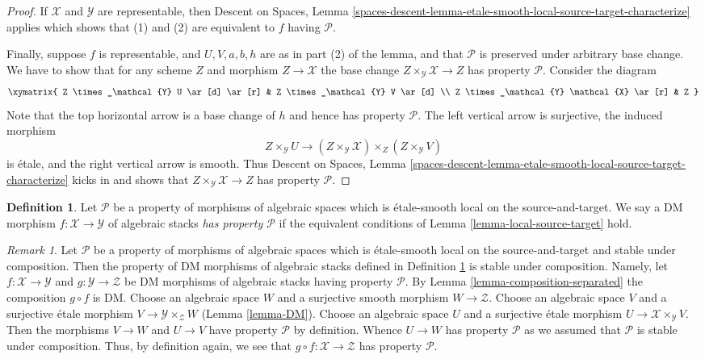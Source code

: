\documentclass{stacks-project}
\theoremstyle{plain}
\theoremstyle{definition}
\newtheorem{definition}[subsection]{Definition}
\theoremstyle{remark}
\newtheorem{remark}[subsection]{Remark}
\numberwithin{equation}{subsection}
\begin{document}
\begin{proof}
\medskip\noindent
If $\mathcal{X}$ and $\mathcal{Y}$ are representable, then
Descent on Spaces,
Lemma \ref{spaces-descent-lemma-etale-smooth-local-source-target-characterize}
applies which shows that (1) and (2) are equivalent to $f$ having
$\mathcal{P}$.

\medskip\noindent
Finally, suppose $f$ is representable, and $U, V, a, b, h$ are
as in part (2) of the lemma, and that $\mathcal{P}$ is preserved under
arbitrary base change. We have to show that for any scheme
$Z$ and morphism $Z \to \mathcal{X}$ the base change
$Z \times_\mathcal{Y} \mathcal{X} \to Z$
has property $\mathcal{P}$. Consider the diagram
$$
\xymatrix{
Z \times_\mathcal{Y} U \ar[d] \ar[r] &
Z \times_\mathcal{Y} V \ar[d] \\
Z \times_\mathcal{Y} \mathcal{X} \ar[r] &
Z
}
$$
Note that the top horizontal arrow is a base change of $h$ and
hence has property $\mathcal{P}$. The left vertical arrow is
surjective, the induced morphism
$$
Z \times_\mathcal{Y} U \longrightarrow
(Z \times_\mathcal{Y} \mathcal{X}) \times_Z (Z \times_\mathcal{Y} V)
$$
is \'etale, and the right vertical arrow is smooth. Thus
Descent on Spaces,
Lemma \ref{spaces-descent-lemma-etale-smooth-local-source-target-characterize}
kicks in and shows that $Z \times_\mathcal{Y} \mathcal{X} \to Z$
has property $\mathcal{P}$.
\end{proof}

\begin{definition}
\label{definition-etale-smooth-P}
Let $\mathcal{P}$ be a property of morphisms of algebraic spaces
which is \'etale-smooth local on the source-and-target.
We say a DM morphism $f : \mathcal{X} \to \mathcal{Y}$ of algebraic stacks
{\it has property $\mathcal{P}$} if the equivalent conditions of
Lemma \ref{lemma-local-source-target}
hold.
\end{definition}

\begin{remark}
\label{remark-etale-smooth-composition}
Let $\mathcal{P}$ be a property of morphisms of algebraic spaces
which is \'etale-smooth local on the source-and-target and
stable under composition. Then the property of DM morphisms of algebraic stacks
defined in Definition \ref{definition-etale-smooth-P}
is stable under composition. Namely, let $f : \mathcal{X} \to \mathcal{Y}$
and $g : \mathcal{Y} \to \mathcal{Z}$ be DM morphisms of algebraic stacks
having property $\mathcal{P}$. By Lemma \ref{lemma-composition-separated}
the composition $g \circ f$ is DM. Choose an algebraic space $W$ and a
surjective smooth morphism $W \to \mathcal{Z}$. Choose an algebraic space
$V$ and a surjective \'etale morphism $V \to \mathcal{Y} \times_\mathcal{Z} W$
(Lemma \ref{lemma-DM}).
Choose an algebraic space $U$ and a surjective \'etale morphism
$U \to \mathcal{X} \times_\mathcal{Y} V$. Then the morphisms
$V \to W$ and $U \to V$ have property $\mathcal{P}$ by definition.
Whence $U \to W$ has property $\mathcal{P}$ as we assumed that
$\mathcal{P}$ is stable under composition. Thus, by definition again,
we see that $g \circ f : \mathcal{X} \to \mathcal{Z}$ has
property $\mathcal{P}$.
\end{remark}
\end{document}

